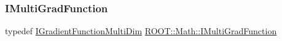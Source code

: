 \mbox{\label{namespaceROOT_1_1Math_a014e019aaf9304a00e9231bd9ed232fb}} 
\subsubsection{\texorpdfstring{IMultiGradFunction}{IMultiGradFunction}}
{\footnotesize\ttfamily typedef \mbox{\hyperlink{classROOT_1_1Math_1_1IGradientFunctionMultiDim}{I\+Gradient\+Function\+Multi\+Dim}} \mbox{\hyperlink{namespaceROOT_1_1Math_a014e019aaf9304a00e9231bd9ed232fb}{R\+O\+O\+T\+::\+Math\+::\+I\+Multi\+Grad\+Function}}}

